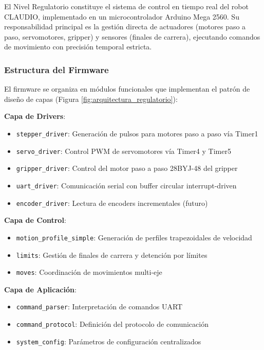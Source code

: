 El Nivel Regulatorio constituye el sistema de control en tiempo real del robot CLAUDIO, implementado en un microcontrolador Arduino Mega 2560. Su responsabilidad principal es la gestión directa de actuadores (motores paso a paso, servomotores, gripper) y sensores (finales de carrera), ejecutando comandos de movimiento con precisión temporal estricta.

\subsubsection{Estructura del Firmware}

El firmware se organiza en módulos funcionales que implementan el patrón de diseño de capas (Figura \ref{fig:arquitectura_regulatorio}):

\textbf{Capa de Drivers}:
\begin{itemize}
    \item \texttt{stepper\_driver}: Generación de pulsos para motores paso a paso vía Timer1
    \item \texttt{servo\_driver}: Control PWM de servomotores vía Timer4 y Timer5
    \item \texttt{gripper\_driver}: Control del motor paso a paso 28BYJ-48 del gripper
    \item \texttt{uart\_driver}: Comunicación serial con buffer circular interrupt-driven
    \item \texttt{encoder\_driver}: Lectura de encoders incrementales (futuro)
\end{itemize}

\textbf{Capa de Control}:
\begin{itemize}
    \item \texttt{motion\_profile\_simple}: Generación de perfiles trapezoidales de velocidad
    \item \texttt{limits}: Gestión de finales de carrera y detención por límites
    \item \texttt{moves}: Coordinación de movimientos multi-eje
\end{itemize}

\textbf{Capa de Aplicación}:
\begin{itemize}
    \item \texttt{command\_parser}: Interpretación de comandos UART
    \item \texttt{command\_protocol}: Definición del protocolo de comunicación
    \item \texttt{system\_config}: Parámetros de configuración centralizados
\end{itemize}

